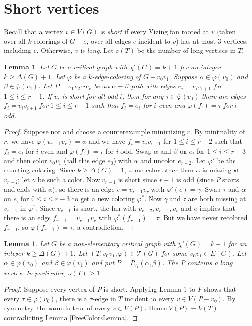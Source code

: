 \documentclass[12pt]{amsart}
\theoremstyle{plain}
\newtheorem{lem}[thm]{Lemma}
\theoremstyle{definition}
\theoremstyle{remark}
\newcommand{\fancy}[1]{\mathcal{#1}}
\newcommand{\T}{\fancy{T}}
\newcommand{\vph}{\varphi}
\newcommand{\vphn}{\overline{\varphi}}
\begin{document}
\section{Short vertices}
Recall that a vertex $v \in V(G)$ is \emph{short} if every Vizing fan rooted
at $v$ (taken over all $k$-colorings of $G-e$, over all edges $e$ incident to
$v$) has at most 3 vertices, including $v$.  Otherwise, $v$ is \emph{long}.
Let $\nu(T)$ be the number of long vertices in $T$.
\begin{lem}\label{SpecialPath}
Let $G$ be a critical graph with $\chi'(G) = k+1$ for an integer $k \ge \Delta(G) + 1$.
Let $\vph$ be a $k$-edge-coloring of $G-v_0v_1$.  Suppose $\alpha \in \vphn(v_0)$ and $\beta \in \vphn(v_1)$.  
Let $P = v_1v_2\cdots v_r$ be an $\alpha-\beta$ path
with edges $e_i = v_iv_{i+1}$ for $1 \le i \le r-1$.  If $v_i$ is short for
all odd $i$, then for any $\tau \in \vphn(v_0)$ there are edges $f_i =
v_iv_{i+1}$ for $1 \le i \le r-1$ such that $f_i = e_i$ for $i$ even and
$\vph(f_i) = \tau$ for $i$ odd.
\end{lem}
\begin{proof}
Suppose not and choose a counterexample minimizing $r$.  By minimality of
$r$, we have $\vph(v_{r-1}v_r) = \alpha$ and we have $f_i = v_iv_{i+1}$ for
$1 \le i \le r-2$ such that $f_i = e_i$ for $i$ even and $\vph(f_i) = \tau$ for
$i$ odd.  Swap $\alpha$ and $\beta$ on $e_i$ for $1 \le i \le r-3$ and then
color $v_0v_1$ (call this edge $e_0$) with $\alpha$ and uncolor $e_{r-2}$.  Let
$\vph'$ be the resulting coloring.  Since $k \ge \Delta(G) + 1$, some color
other than $\alpha$ is missing at $v_{r-2}$; let $\gamma$ be such a color.  Now 
$v_{r-1}$ is short since $r-1$ is odd (since $P$ starts and ends with
$\alpha$), so there is an edge $e = v_{r-1}v_r$ with $\vph'(e) = \gamma$.  
Swap $\tau$ and $\alpha$ on $e_i$ for $0 \le i \le r-3$ to get a new coloring
$\vph^*$.  Now $\gamma$ and $\tau$ are both missing at $v_{r-2}$ in $\vph^*$.
Since $v_{r-1}$ is short, the fan with $v_{r-2}, v_{r-1}, v_r$ and $e$
implies that there is an edge $f_{r-1} = v_{r-1}v_r$ with $\vph^*(f_{r-1}) =
\tau$.  But we have never recolored $f_{r-1}$, so $\vph(f_{r-1})=\tau$, a
contradiction.
\end{proof}

\begin{lem}\label{ZeroNonSpecial}
Let $G$ be a non-elementary critical graph with $\chi'(G) = k+1$ for an integer $k \ge \Delta(G) + 1$.
Let $(T, v_0v_1, \vph) \in \T(G)$ for some $v_0v_1 \in E(G)$.  Let $\alpha \in \vphn(v_0)$ and $\beta \in \vphn(v_1)$ and put $P = P_{v_1}(\alpha, \beta)$.  The $P$ contains a long vertex. 
In particular, $\nu(T) \ge 1$.
\label{lem2}
\end{lem}
\begin{proof}
Suppose every vertex of $P$ is short.  Applying Lemma \ref{SpecialPath} to $P$ shows that every $\tau \in \vphn(v_0)$, 
there is a $\tau$-edge in $T$ incident to every $v \in V(P - v_0)$. By symmetry, the same is true of every $v \in V(P)$.  Hence $V(P) = V(T)$ contradicting Lemma \ref{FreeColorsLemma}.
\end{proof}
\end{document}
